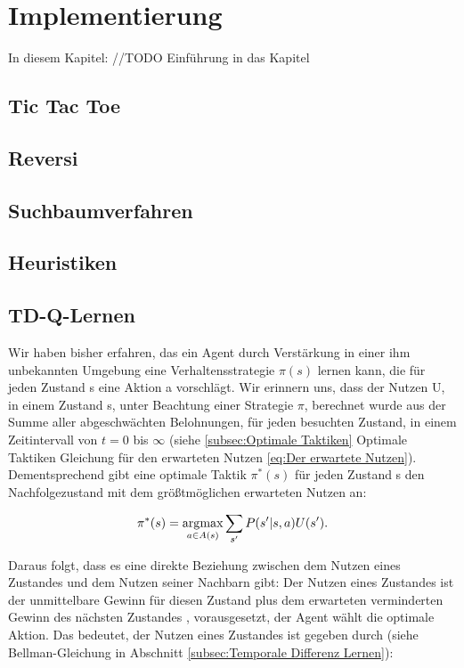 \chapter{Implementierung}
\label{cha:Implementierung}

In diesem Kapitel: //TODO Einführung in das Kapitel

\section{Tic Tac Toe}

\section{Reversi}

\section{Suchbaumverfahren}

\section{Heuristiken}

\section{TD-Q-Lernen}

Wir haben bisher erfahren, das ein Agent durch Verstärkung in einer ihm unbekannten Umgebung eine Verhaltensstrategie $\pi(s)$ lernen kann, die für jeden Zustand s eine Aktion a vorschlägt. Wir erinnern uns, dass der Nutzen U, in einem Zustand s, unter Beachtung einer Strategie $\pi$, berechnet wurde aus der Summe aller abgeschwächten Belohnungen, für jeden besuchten Zustand, in einem Zeitintervall von $t = 0$ bis $\infty$ (siehe \ref{subsec:Optimale Taktiken} Optimale Taktiken Gleichung für den erwarteten Nutzen \ref{eq:Der erwartete Nutzen}). Dementsprechend gibt eine optimale Taktik $\pi^*(s)$ für jeden Zustand s den Nachfolgezustand mit dem größtmöglichen erwarteten Nutzen an:

\begin{equation}
\pi^*(s) = \operatorname*{arg\!\max}_{a \in A(s)} \sum_{s'} P(s'|s, a) U(s').
\end{equation}

Daraus folgt, dass es eine direkte Beziehung zwischen dem Nutzen eines Zustandes und dem Nutzen seiner Nachbarn gibt: Der Nutzen eines Zustandes ist der unmittelbare Gewinn für diesen Zustand plus dem erwarteten verminderten Gewinn des nächsten Zustandes , vorausgesetzt, der Agent wählt die optimale Aktion. Das bedeutet, der Nutzen eines Zustandes ist gegeben durch (siehe Bellman-Gleichung in Abschnitt \ref{subsec:Temporale Differenz Lernen}):

